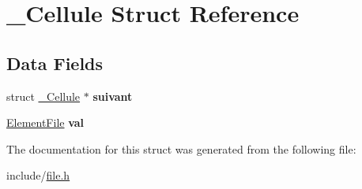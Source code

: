 \hypertarget{struct___cellule}{\section{\-\_\-\-Cellule Struct Reference}
\label{struct___cellule}
}
\subsection*{Data Fields}
\begin{DoxyCompactItemize}
\item 
\hypertarget{struct___cellule_a23c26b6a4391bd5d9d3a64623fd14be5}{struct \hyperlink{struct___cellule}{\-\_\-\-Cellule} $\ast$ {\bfseries suivant}}\label{struct___cellule_a23c26b6a4391bd5d9d3a64623fd14be5}

\item 
\hypertarget{struct___cellule_ac1e94328fa37165c435b8d400b3e8856}{\hyperlink{struct___element_file}{Element\-File} {\bfseries val}}\label{struct___cellule_ac1e94328fa37165c435b8d400b3e8856}

\end{DoxyCompactItemize}


The documentation for this struct was generated from the following file\-:\begin{DoxyCompactItemize}
\item 
include/\hyperlink{file_8h}{file.\-h}\end{DoxyCompactItemize}
